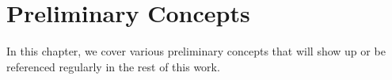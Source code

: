 \chapter{Preliminary Concepts}
\label{ch:prelims}

In this chapter, we cover various preliminary concepts that will show up or be referenced regularly in the rest of this work.
%

% 
%

%

%

%

%

%


